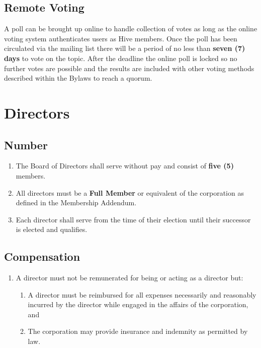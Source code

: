 \documentclass{article}
\begin{document}
\subsection{Remote Voting}
A poll can be brought up online to handle collection of votes as long as the online voting system authenticates users as Hive members. Once the poll has been circulated via the mailing list there will be a period of no less than \textbf{seven (7) days} to vote on the topic. After the deadline the online poll is locked so no further votes are possible and the results are included with other voting methods described within the Bylaws to reach a quorum.




\section{Directors}
\subsection{Number}
\begin{enumerate}
  \item The Board of Directors shall serve without pay and consist of \textbf{five (5)}
  members.
  \item All directors must be a \textbf{Full Member} or equivalent of the corporation as
  defined in the Membership Addendum.
  \item Each director shall serve from the time of their election until their
  successor is elected and qualifies.
\end{enumerate}
\subsection{Compensation}
\begin{enumerate}
  \item A director must not be remunerated for being or acting as a director but:
  \begin{enumerate}
    \item A director must be reimbursed for all expenses necessarily and
    reasonably incurred by the director while engaged in the affairs of the corporation, and
    \item The corporation may provide insurance and indemnity as permitted by law.
  \end{enumerate}
\end{enumerate}
\end{document}
